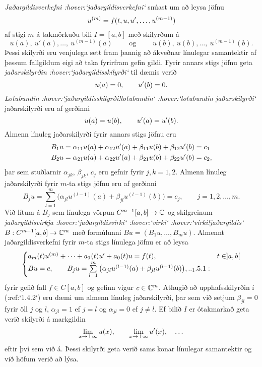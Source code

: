 \noindent
{\it Jaðargildisverkefni :hover:`jaðargildisverkefni`}  snúast um að leysa jöfnu
$$u^{(m)}=f(t,u,u{\sp{\prime}},\dots,u^{(m-1)})$$  
af stigi $m$ á takmörkuðu bili
$I=[a,b]$ með skilyrðum á 
$$
u(a), \ u'(a),\dots,  \ u^{(m-1)}(a)\qquad \text{ og } 
\qquad  u(b), \ u(b),\dots, \ u^{(m-1)}(b).
$$  
Þessi skilyrði eru venjulega sett fram þannig að ákveðnar línulegar
samantektir af þessum fallgildum eigi að taka fyrirfram gefin gildi.
Fyrir annars stigs jöfnu geta {\it
jaðarskilyrðin :hover:`jaðargildisskilyrði`} til dæmis verið
$$
u(a)=0, \qquad u{\sp{\prime}}(b)=0.
$$
{\it Lotubundin :hover:`jaðargildisskilyrði!lotubundin` :hover:`lotubundin
jaðarskilyrði`} jaðarskilyrði eru af gerðinni
$$
u(a)=u(b), \qquad u{\sp{\prime}}(a)=u{\sp{\prime}}(b).
$$
Almenn línuleg jaðarskilyrði fyrir annars stigs jöfnu eru 
\begin{align*}
B_1u&={\alpha}_{11}u(a)+{\alpha}_{12}u{\sp{\prime}}(a)
    +{\beta}_{11}u(b)+{\beta}_{12}u{\sp{\prime}}(b)=c_1\\
B_2u&={\alpha}_{21}u(a)+{\alpha}_{22}u{\sp{\prime}}(a)
    +{\beta}_{21}u(b)+{\beta}_{22}u{\sp{\prime}}(b)=c_2,
\end{align*}
þar sem stuðlarnir ${\alpha}_{jk}$, ${\beta}_{jk}$, $c_{j}$ eru gefnir
fyrir $j,k=1,2$.  Almenn línuleg jaðarskilyrði fyrir $m$-ta stigs  jöfnu
eru af gerðinni
$$
B_ju=\sum\limits_{l=1}^m \big({\alpha}_{jl}u^{(l-1)}(a)
+{\beta}_{jl}u^{(l-1)}(b)\big)=c_j, \qquad j=1,2,\dots,m.
$$
Við lítum á $B_j$ sem línulega vörpun $C^{m-1}[a,b]\to {\mathbb C}$ 
og skilgreinum {\it
jaðargildisvirkja :hover:`jaðargildisvirki` :hover:`virki` :hover:`virki!jaðargildis`}  
$B:C^{m-1}[a,b]\to {\mathbb C}^m$ með formúlunni
$Bu=(B_1u,\dots,B_mu)$.  Almennt jaðargildisverkefni fyrir $m$-ta stigs
línulega jöfnu er að leysa
\begin{equation*}
\begin{cases}
a_m(t)u^{(m)}+\cdots+a_1(t)u{\sp{\prime}}+a_0(t)u=f(t),  &t\in ]a,b[\\
Bu=c, \qquad B_ju=\sum\limits_{l=1}^m \big({\alpha}_{jl}u^{(l-1)}(a)
+{\beta}_{jl}u^{(l-1)}(b)\big), 

.. _1.5.1:

\end{cases} 
\end{equation*} 
fyrir gefið fall $f\in C[a,b]$ og gefinn vigur $c\in {\mathbb C}^m$.  Athugið að
upphafsskilyrðin í (:ref:`1.4.2`) eru dæmi um almenn línuleg 
jaðarskilyrði, þar
sem við setjum ${\beta}_{jl}=0$ fyrir öll $j$ og $l$, ${\alpha}_{jl}=1$
ef $j=l$ og ${\alpha}_{jl}=0$ ef $j\neq l$. 
Ef bilið $I$
er ótakmarkað geta verið skilyrði á markgildin 
$$
\lim_{x\to\pm\infty}u(x), \qquad 
\lim_{x\to \pm\infty}u{\sp{\prime}}(x),\quad \dots 
$$
eftir því sem við á.  Þessi skilyrði geta verið sams konar línulegar 
samantektir og við höfum verið að lýsa.



